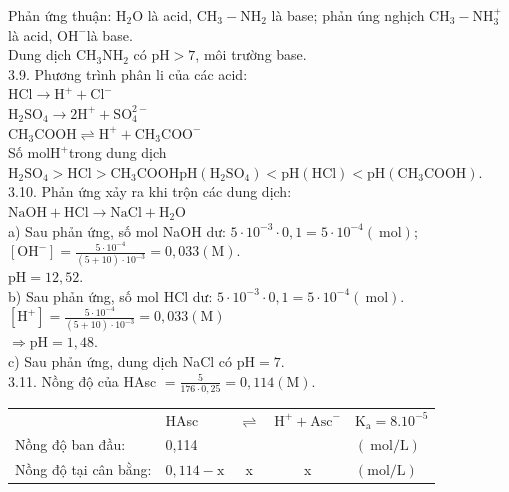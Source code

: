 \documentclass[10pt]{article}
\begin{document}
Phản ứng thuận: $\mathrm{H}_{2} \mathrm{O}$ là acid, $\mathrm{CH}_{3}-\mathrm{NH}_{2}$ là base; phản úng nghịch $\mathrm{CH}_{3}-\mathrm{NH}_{3}^{+}$ là acid, $\mathrm{OH}^{-}$là base.\\
Dung dịch $\mathrm{CH}_{3} \mathrm{NH}_{2}$ có $\mathrm{pH}>7$, môi trường base.\\
3.9. Phương trình phân li của các acid:\\
$\mathrm{HCl} \longrightarrow \mathrm{H}^{+}+\mathrm{Cl}^{-}$\\
$\mathrm{H}_{2} \mathrm{SO}_{4} \longrightarrow 2 \mathrm{H}^{+}+\mathrm{SO}_{4}^{2-}$\\
$\mathrm{CH}_{3} \mathrm{COOH} \rightleftharpoons \mathrm{H}^{+}+\mathrm{CH}_{3} \mathrm{COO}^{-}$\\
Số $\mathrm{mol} \mathrm{H}^{+}$trong dung dịch $\mathrm{H}_{2} \mathrm{SO}_{4}>\mathrm{HCl}>\mathrm{CH}_{3} \mathrm{COOH} \mathrm{pH}\left(\mathrm{H}_{2} \mathrm{SO}_{4}\right)<\mathrm{pH}(\mathrm{HCl})<\mathrm{pH}\left(\mathrm{CH}_{3} \mathrm{COOH}\right)$.\\
3.10. Phản ứng xảy ra khi trộn các dung dịch:\\
$\mathrm{NaOH}+\mathrm{HCl} \longrightarrow \mathrm{NaCl}+\mathrm{H}_{2} \mathrm{O}$\\
a) Sau phản ứng, số mol NaOH dư: $5 \cdot 10^{-3} \cdot 0,1=5 \cdot 10^{-4}(\mathrm{~mol})$;\\
$\left[\mathrm{OH}^{-}\right]=\frac{5 \cdot 10^{-4}}{(5+10) \cdot 10^{-3}}=0,033(\mathrm{M})$.\\
$\mathrm{pH}=12,52$.\\
b) Sau phản ứng, số mol HCl dư: $5 \cdot 10^{-3} \cdot 0,1=5 \cdot 10^{-4}(\mathrm{~mol})$.\\
$\left[\mathrm{H}^{+}\right]=\frac{5 \cdot 10^{-4}}{(5+10) \cdot 10^{-3}}=0,033(\mathrm{M})$\\
$\Rightarrow \mathrm{pH}=1,48$.\\
c) Sau phản ứng, dung dịch NaCl có $\mathrm{pH}=7$.\\
3.11. Nồng độ của HAsc $=\frac{5}{176 \cdot 0,25}=0,114(\mathrm{M})$.

\begin{center}
\begin{tabular}{llccl}
 & HAsc & $\rightleftharpoons$ & $\mathrm{H}^{+}+\mathrm{Asc}^{-}$ & $\mathrm{K}_{\mathrm{a}}=8.10^{-5}$ \\
Nồng độ ban đầu: & 0,114 &  &  & $(\mathrm{~mol} / \mathrm{L})$ \\
Nồng độ tại cân bằng: & $0,114-\mathrm{x}$ & x & x & $(\mathrm{mol} / \mathrm{L})$ \\
\end{tabular}
\end{center}
\end{document}
